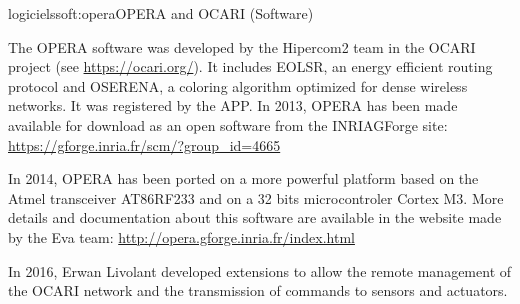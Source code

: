 \documentclass{ra2016}
\newcommand{\pascale}          {\textbf{Pascale~Minet}}
\begin{document}
\begin{module}{logiciels}{soft:opera}{OPERA and OCARI (Software)} 

\begin{participants}
\end{participants}

The OPERA software was developed by the Hipercom2 team in the OCARI project (see \url{https://ocari.org/}). It includes EOLSR, an  energy efficient routing protocol and OSERENA, a coloring algorithm optimized for dense wireless networks. It was registered by the APP.
In 2013, OPERA has been made available for download as an open software from the INRIAGForge site: \url{https://gforge.inria.fr/scm/?group_id=4665}

In 2014, OPERA has been ported on a more powerful platform based on the Atmel transceiver AT86RF233 and on a 32 bits microcontroler Cortex M3.
More details and documentation about this software are available in the website made by the Eva team:
\url{http://opera.gforge.inria.fr/index.html}

In 2016, Erwan Livolant developed extensions to allow the remote management of the OCARI 
network and the transmission of commands to sensors and actuators. 


\end{module}
\end{document}
